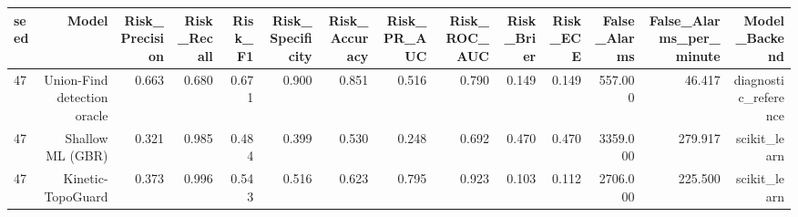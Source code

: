 \begin{tabular}{lrrrrrrrrrrrrr}
\toprule
seed & Model & Risk\_Precision & Risk\_Recall & Risk\_F1 & Risk\_Specificity & Risk\_Accuracy & Risk\_PR\_AUC & Risk\_ROC\_AUC & Risk\_Brier & Risk\_ECE & False\_Alarms & False\_Alarms\_per\_minute & Model\_Backend \\
\midrule
47 & Union-Find detection oracle & 0.663 & 0.680 & 0.671 & 0.900 & 0.851 & 0.516 & 0.790 & 0.149 & 0.149 & 557.000 & 46.417 & diagnostic\_reference \\
47 & Shallow ML (GBR) & 0.321 & 0.985 & 0.484 & 0.399 & 0.530 & 0.248 & 0.692 & 0.470 & 0.470 & 3359.000 & 279.917 & scikit\_learn \\
47 & Kinetic-TopoGuard & 0.373 & 0.996 & 0.543 & 0.516 & 0.623 & 0.795 & 0.923 & 0.103 & 0.112 & 2706.000 & 225.500 & scikit\_learn \\
\bottomrule
\end{tabular}